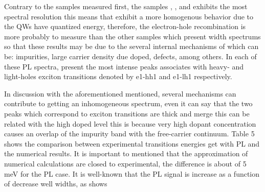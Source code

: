 Contrary to the samples measured first, the samples , , and  exhibits the most spectral resolution this means that exhibit a more homogenous behavior  due to the QWs have quantized energy, therefore, the electron-hole recombination is more probably to measure than the other samples which present width spectrums so that these results may be due to the several internal mechanisms of which can be: impurities, large carrier density due doped,  defects, among others\cite{khmissi2010effectcarriers,kundrotas2005excitonic}. In each of these PL spectra,  present the most intense peaks associates with heavy- and light-holes exciton transitions denoted by e1-hh1 and e1-lh1 respectively.

In discussion with the aforementioned mentioned, several mechanisms can contribute to getting an inhomogeneous spectrum, even it can say that the two peaks which correspond to exciton transitions are thick and merge this can be related with the high doped level this is because very high dopant concentration causes an overlap of the impurity band with the free-carrier continuum\cite{kundrotas2005excitonic}. Table 5 shows the comparison between experimental transitions energies get with PL and the numerical results. It is important to mentioned that the approximation of numerical calculations are closed to experimental, the difference  is about of 5 meV for the PL case. It is well-known that the PL signal is increase as a function of decrease well widths, as shows 
